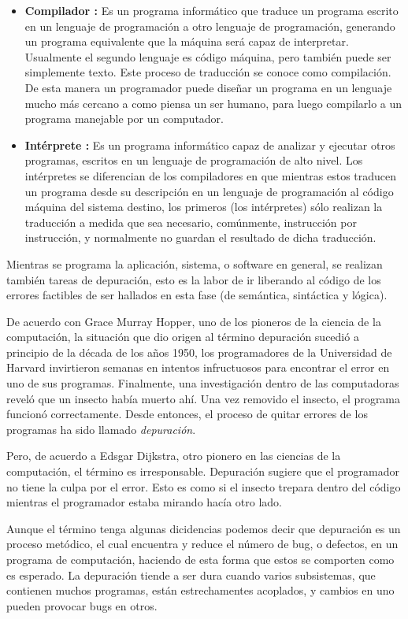 \documentclass[12pt,legalpaper]{report}
\begin{document}
\begin{itemize}
	\item \textbf{Compilador :} Es un programa informático que traduce un programa escrito en un lenguaje de programación a otro lenguaje de programación, generando un programa equivalente que la máquina será capaz de interpretar. Usualmente el segundo lenguaje es código máquina, pero también puede ser simplemente texto. Este proceso de traducción se conoce como compilación. De esta manera un programador puede diseñar un programa en un lenguaje mucho más cercano a como piensa un ser humano, para luego compilarlo a un programa manejable por un computador.

	\item \textbf{Intérprete :} Es un programa informático capaz de analizar y ejecutar otros programas, escritos en un lenguaje de programación de alto nivel. Los intérpretes se diferencian de los compiladores en que mientras estos traducen un programa desde su descripción en un lenguaje de programación al código máquina del sistema destino, los primeros (los intérpretes) sólo realizan la traducción a medida que sea necesario, comúnmente, instrucción por instrucción, y normalmente no guardan el resultado de dicha traducción.
	
\end{itemize}

Mientras se programa la aplicación, sistema, o software en general, se realizan también tareas de depuración, esto es la labor de ir liberando al código de los errores factibles de ser hallados en esta fase (de semántica, sintáctica y lógica). 

De acuerdo con Grace Murray Hopper, uno de los pioneros de la ciencia de la computación, la situación que dio origen al término depuración sucedió a principio de la década de los años 1950, los programadores de la Universidad de Harvard invirtieron semanas en intentos infructuosos para encontrar el error en uno de sus programas. Finalmente, una investigación dentro de las computadoras reveló que un insecto había muerto ahí. Una vez removido el insecto, el programa funcionó correctamente. Desde entonces, el proceso de quitar errores de los programas ha sido llamado \textit{depuración}.

Pero, de acuerdo a Edsgar Dijkstra, otro pionero en las ciencias de la computación, el término es irresponsable. Depuración sugiere que el programador no tiene la culpa por el error. Esto es como si el insecto trepara dentro del código mientras el programador estaba mirando hacía otro lado.

Aunque el término tenga algunas dicidencias podemos decir que depuración es un proceso metódico, el cual encuentra y reduce el número de bug, o defectos, en un programa de computación, haciendo de esta forma que estos se comporten como es esperado.  La depuración tiende a ser dura cuando varios subsistemas, que contienen muchos programas, están estrechamentes acoplados, y cambios en uno pueden provocar bugs en otros.
\end{document}
